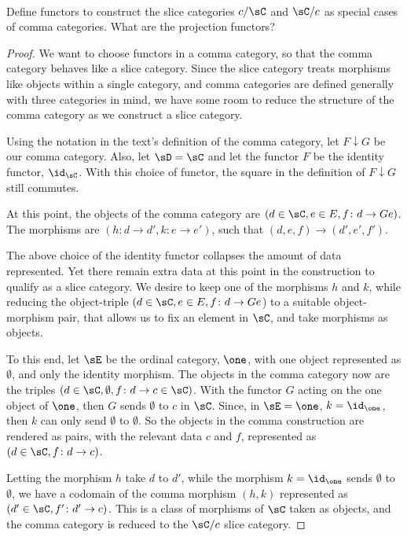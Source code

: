 \documentclass[../../main]{subfiles}
\begin{document}
\paragraph{}
\begin{exercise}
	Define functors to construct the slice categories $c/\sC$ and $\sC/c$ as special
	cases of comma categories. What are the projection functors?
\end{exercise}

\begin{proof}
	We want to choose functors in a comma category, so that the comma category
	behaves like a slice category. Since the slice category treats morphisms
	like objects within a single category, and comma categories are defined
	generally with three categories in mind, we have some room to reduce the
	structure of the comma category as we construct a slice category.

	Using the notation in the text's definition of the comma category, let
	$F\downarrow G$ be our comma category. Also, let $\sD = \sC$ and let the functor
	$F$ be the identity functor, $\id_\sC$. With this choice of functor, the
	square in the definition of $F\downarrow G$ still commutes.

	At this point, the objects of the comma category are $(d \in \sC, e\in E, f\colon d
	\rightarrow Ge)$. The morphisms are $(h\colon d\rightarrow d', k\colon e\rightarrow
	e')$, such that $(d,e,f) \rightarrow (d',e',f')$.

	The above choice of the identity functor collapses the amount of data
	represented. Yet there remain extra data at this point in the construction
	to qualify as a slice category. We desire to keep one of the morphisms $h$
	and $k$, while reducing the object-triple $(d \in \sC, e\in E, f\colon d
	\rightarrow Ge$) to a suitable object-morphism pair, that allows us to fix
	an element in \(\sC\), and take morphisms as objects.

	To this end, let \(\sE\) be the ordinal category, $\one$, with one object
	represented as $\emptyset$, and only the identity morphism. The objects in
	the comma category now are the triples $(d \in \sC, \emptyset, f\colon d
	\rightarrow c \in \sC)$. With the functor $G$ acting on the one object of
	$\one$, then $G$ sends $\emptyset$ to $ c $ in $\sC$. Since, in $\sE =
	\one$, $k = \id_{\one}$, then $k$ can only send $\emptyset$ to
	$\emptyset$. So the objects in the comma construction are rendered as pairs,
	with the relevant data $c$ and $f$, represented as $(d \in \sC, f\colon d
	\rightarrow c)$.

	Letting the morphism $h$ take $d$ to $d'$, while the morphism $k =
	\id_{\one}$ sends $\emptyset$ to $\emptyset$, we have a codomain of the
	comma morphism $(h,k)$ represented as $(d' \in \sC, f'\colon d' \rightarrow
	c)$. This is a class of morphisms of \(\sC\) taken as objects, and the comma
	category is reduced to the $\sC/c$ slice category.
\end{proof}
\end{document}
